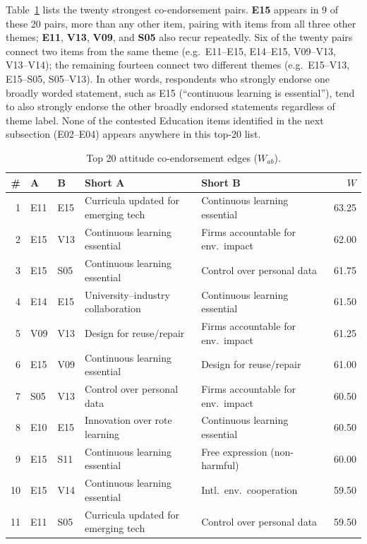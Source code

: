 \documentclass[10pt]{article}
\begin{document}
Table~\ref{tab:top20} lists the twenty strongest co-endorsement pairs. \textbf{E15}
appears in 9 of these 20 pairs, more than any other item, pairing with items from all
three other themes; \textbf{E11}, \textbf{V13}, \textbf{V09}, and \textbf{S05} also
recur repeatedly. Six of the twenty pairs connect two items from the same theme (e.g.\
E11--E15, E14--E15, V09--V13, V13--V14); the remaining fourteen connect two different
themes (e.g.\ E15--V13, E15--S05, S05--V13). In other words, respondents who strongly
endorse one broadly worded statement, such as E15 (``continuous learning is
essential''), tend to also strongly endorse the other broadly endorsed statements
regardless of theme label. None of the contested Education items identified in the next
subsection (E02--E04) appears anywhere in this top-20 list.

\begin{table}[H]
\centering
\caption{Top 20 attitude co-endorsement edges ($W_{ab}$).}
\label{tab:top20}
\scriptsize
\setlength{\tabcolsep}{4pt}
\begin{tabular}{@{}rllp{5.6cm}p{5.6cm}r@{}}
\toprule
\# & A & B & Short A & Short B & $W$ \\
\midrule
1  & E11 & E15 & Curricula updated for emerging tech & Continuous learning essential & 63.25 \\
2  & E15 & V13 & Continuous learning essential & Firms accountable for env.\ impact & 62.00 \\
3  & E15 & S05 & Continuous learning essential & Control over personal data & 61.75 \\
4  & E14 & E15 & University--industry collaboration & Continuous learning essential & 61.50 \\
5  & V09 & V13 & Design for reuse/repair & Firms accountable for env.\ impact & 61.25 \\
6  & E15 & V09 & Continuous learning essential & Design for reuse/repair & 61.00 \\
7  & S05 & V13 & Control over personal data & Firms accountable for env.\ impact & 60.50 \\
8  & E10 & E15 & Innovation over rote learning & Continuous learning essential & 60.50 \\
9  & E15 & S11 & Continuous learning essential & Free expression (non-harmful) & 60.00 \\
10 & E15 & V14 & Continuous learning essential & Intl.\ env.\ cooperation & 59.50 \\
11 & E11 & S05 & Curricula updated for emerging tech & Control over personal data & 59.50 \\

\end{tabular}
\end{table}
\end{document}
